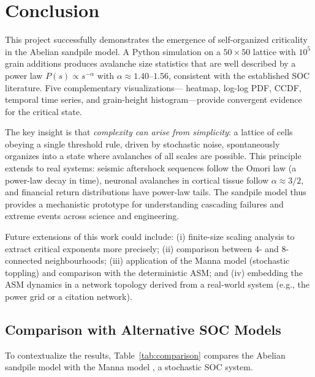 \documentclass[12pt,a4paper]{article}
\begin{document}
\section{Conclusion}
\label{sec:conclusion}

This project successfully demonstrates the emergence of self-organized criticality in
the Abelian sandpile model.  A Python simulation on a $50\times50$ lattice with
$10^5$ grain additions produces avalanche size statistics that are well described
by a power law $P(s)\propto s^{-\alpha}$ with $\alpha\approx1.40$--$1.56$,
consistent with the established SOC literature.  Five complementary visualizations—
heatmap, log-log PDF, CCDF, temporal time series, and grain-height histogram—provide
convergent evidence for the critical state.

The key insight is that \emph{complexity can arise from simplicity}: a lattice of
cells obeying a single threshold rule, driven by stochastic noise, spontaneously
organizes into a state where avalanches of all scales are possible.  This principle
extends to real systems: seismic aftershock sequences follow the Omori law
(a power-law decay in time), neuronal avalanches in cortical tissue follow
$\alpha\approx3/2$, and financial return distributions have power-law tails.
The sandpile model thus provides a mechanistic prototype for understanding cascading
failures and extreme events across science and engineering.

Future extensions of this work could include: (i) finite-size scaling analysis
to extract critical exponents more precisely; (ii) comparison between 4- and
8-connected neighbourhoods; (iii) application of the Manna model (stochastic
toppling) and comparison with the deterministic ASM; and (iv) embedding the
ASM dynamics in a network topology derived from a real-world system (e.g., the
power grid or a citation network).
\subsection{Comparison with Alternative SOC Models}
\label{sec:comparison}

To contextualize the results, Table~\ref{tab:comparison} compares the Abelian
sandpile model with the Manna model \cite{manna1991}, a stochastic SOC system.
\end{document}
